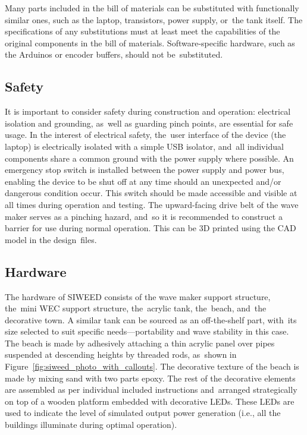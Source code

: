 \documentclass[hardware,article,submit,pdftex,moreauthors]{Definitions/mdpi}
\begin{document}
Many parts included in the bill of materials can be substituted with functionally similar ones, such as the laptop, transistors, power supply, or~the tank itself.
The specifications of any substitutions must at least meet the capabilities of the original components in the bill of materials.
Software-specific hardware, such as the Arduinos or encoder buffers, should not be~substituted. 

\subsection{Safety}
It is important to consider safety during construction and operation: electrical isolation and grounding, as~well as guarding pinch points, are essential for safe usage.
In the interest of electrical safety, the~user interface of the device (the laptop) is electrically isolated with a simple USB isolator, and~all individual components share a common ground with the power supply where possible.
An emergency stop switch is installed between the power supply and power bus, enabling the device to be shut off at any time should an unexpected and/or dangerous condition occur.
This switch should be made accessible and visible at all times during operation and testing.
The upward-facing drive belt of the wave maker serves as a pinching hazard, and~so it is recommended to construct a barrier for use during normal operation.
This can be 3D printed using the CAD model in the design~files.


\subsection{Hardware}
The hardware of SIWEED consists of the wave maker support structure, the~mini WEC support structure, the~acrylic tank, the~beach, and~the decorative town. 
A similar tank can be sourced as an off-the-shelf part, with~its size selected to suit specific needs---portability and wave stability in this case. 
The beach is made by adhesively attaching a thin acrylic panel over pipes suspended at descending heights by threaded rods, as~shown in Figure~\ref{fig:siweed_photo_with_callouts}.
The decorative texture of the beach is made by mixing sand with two parts epoxy.
The rest of the decorative elements are assembled as per individual included instructions and~arranged strategically on top of a wooden platform embedded with decorative LEDs. 
These LEDs are used to indicate the level of simulated output power generation (i.e., all the buildings illuminate during optimal operation).
\end{document}
